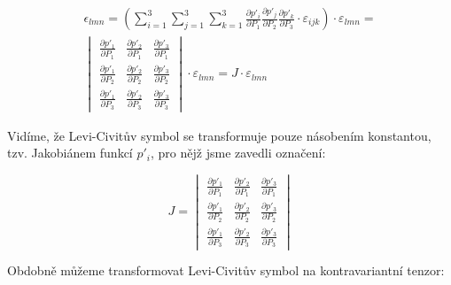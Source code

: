 \begin{equation}
\begin{split}
\epsilon_{lmn} = \left(\sum_{i=1}^3 \sum_{j=1}^3 \sum_{k=1}^3 \frac{\partial p'_i}{\partial P_1} \frac{\partial p'_j}{\partial P_2} \frac{\partial p'_k}{\partial P_3} \cdot \varepsilon_{ijk} \right) \cdot \varepsilon_{lmn} = \\
\begin{vmatrix}
  \frac{\partial p'_1}{\partial P_1} & \frac{\partial p'_2}{\partial P_1} & \frac{\partial p'_3}{\partial P_1} \\
  \frac{\partial p'_1}{\partial P_2} & \frac{\partial p'_2}{\partial P_2} & \frac{\partial p'_3}{\partial P_2} \\
  \frac{\partial p'_1}{\partial P_3} & \frac{\partial p'_2}{\partial P_3} & \frac{\partial p'_3}{\partial P_3}
\end{vmatrix}
\cdot \varepsilon_{lmn} = J \cdot \varepsilon_{lmn}
\end{split}
\end{equation}

Vidíme, že Levi-Civitův symbol se transformuje pouze násobením konstantou, tzv. Jakobiánem funkcí \(p'_i\), pro nějž jsme zavedli označení:

\begin{equation}
J = 
\begin{vmatrix}
  \frac{\partial p'_1}{\partial P_1} & \frac{\partial p'_2}{\partial P_1} & \frac{\partial p'_3}{\partial P_1} \\
  \frac{\partial p'_1}{\partial P_2} & \frac{\partial p'_2}{\partial P_2} & \frac{\partial p'_3}{\partial P_2} \\
  \frac{\partial p'_1}{\partial P_3} & \frac{\partial p'_2}{\partial P_3} & \frac{\partial p'_3}{\partial P_3}
\end{vmatrix}
\end{equation}

Obdobně můžeme transformovat Levi-Civitův symbol na kontravariantní tenzor:

